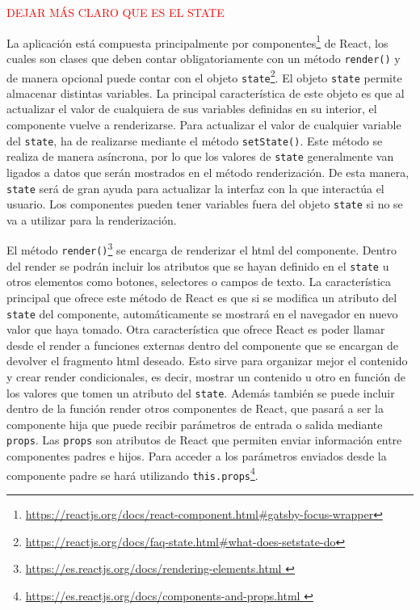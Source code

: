\textcolor{red}{DEJAR MÁS CLARO QUE ES EL STATE}


La aplicación está compuesta principalmente por componentes\footnote{\url{https://reactjs.org/docs/react-component.html\#gatsby-focus-wrapper}} de React, los cuales son clases que deben contar obligatoriamente con un método \texttt{render()} y de manera opcional puede contar con el objeto \texttt{state}\footnote{\url{https://reactjs.org/docs/faq-state.html\#what-does-setstate-do}}. El objeto \texttt{state} permite almacenar distintas variables. La principal característica de este objeto es que al actualizar el valor de cualquiera de sus variables definidas en su interior, el componente vuelve a renderizarse. Para actualizar el valor de cualquier variable del \texttt{state}, ha de realizarse mediante el método \texttt{setState()}. Este método se realiza de manera asíncrona, por lo que los valores de \texttt{state} generalmente van ligados a datos que serán mostrados en el método renderización. De esta manera,  \texttt{state} será de gran ayuda para actualizar la interfaz con la que interactúa el usuario. 
Los componentes pueden tener variables fuera del objeto \texttt{state} si no se va a utilizar para la renderización.  


El método \texttt{render()}\footnote{\url{https://es.reactjs.org/docs/rendering-elements.html }} se encarga de renderizar el html del componente. Dentro del render se podrán incluir los atributos que se hayan definido en el \texttt{state} u otros elementos como botones, selectores o campos de texto. 
La característica principal que ofrece este método de React es que si se modifica un atributo del \texttt{state} del componente, automáticamente se mostrará en el navegador en nuevo valor que haya tomado. Otra característica que ofrece React es poder llamar desde el render a funciones externas dentro del componente que se encargan de devolver el fragmento html deseado. Esto sirve para organizar mejor el contenido y crear render condicionales, es decir, mostrar un contenido u otro en función de los valores que tomen un atributo del \texttt{state}.
Además también se puede incluir dentro de la función render otros componentes de React, que pasará a ser la componente hija que puede recibir parámetros de entrada o salida mediante \texttt{props}. Las \texttt{props} son atributos de React que permiten enviar información entre componentes padres e hijos. Para acceder a los parámetros enviados desde la componente padre se hará utilizando \texttt{this.props}\footnote{\url{https://es.reactjs.org/docs/components-and-props.html }}.

